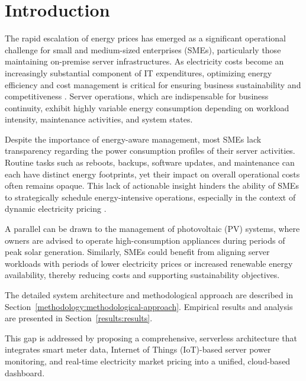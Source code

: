 
\section{Introduction}
\label{introduction:introduction}
The rapid escalation of energy prices has emerged as a significant operational challenge for small and medium-sized enterprises (SMEs), particularly those maintaining on-premise server infrastructures. As electricity costs become an increasingly substantial component of IT expenditures, optimizing energy efficiency and cost management is critical for ensuring business sustainability and competitiveness \cite{gennitsaris2023sme} \cite{ec2022energyefficiencysmes}. Server operations, which are indispensable for business continuity, exhibit highly variable energy consumption depending on workload intensity, maintenance activities, and system states.

Despite the importance of energy-aware management, most SMEs lack transparency regarding the power consumption profiles of their server activities. Routine tasks such as reboots, backups, software updates, and maintenance can each have distinct energy footprints, yet their impact on overall operational costs often remains opaque. This lack of actionable insight hinders the ability of SMEs to strategically schedule energy-intensive operations, especially in the context of dynamic electricity pricing \cite{ristic2021iotenergymanagement}.

A parallel can be drawn to the management of photovoltaic (PV) systems, where owners are advised to operate high-consumption appliances during periods of peak solar generation. Similarly, SMEs could benefit from aligning server workloads with periods of lower electricity prices or increased renewable energy availability, thereby reducing costs and supporting sustainability objectives.

The detailed system architecture and methodological approach are described in Section~\ref{methodology:methodological-approach}. Empirical results and analysis are presented in Section~\ref{results:results}.

This gap is addressed by proposing a comprehensive, serverless architecture that integrates smart meter data, Internet of Things (IoT)-based server power monitoring, and real-time electricity market pricing into a unified, cloud-based dashboard.

